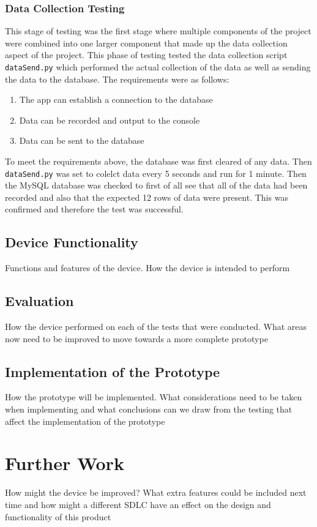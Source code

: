 \documentclass[10pt,a4paper]{article}
\begin{document}
\subsubsection{Data Collection Testing}
This stage of testing was the first stage where multiple components of the project were combined into one larger component that made up the data collection aspect of the project. This phase of testing tested the data collection script \texttt{dataSend.py} which performed the actual collection of the data as well as sending the data to the database. The requirements were as follows: 

\begin{enumerate}
  \item The app can establish a connection to the database
  \item Data can be recorded and output to the console
  \item Data can be sent to the database
\end{enumerate}

To meet the requirements above, the database was first cleared of any data. Then \texttt{dataSend.py} was set to colelct data every 5 seconds and run for 1 minute. Then the MySQL database was checked to first of all see that all of the data had been recorded and also that the expected 12 rows of data were present. This was confirmed and therefore the test was successful.

\subsection{Device Functionality}
Functions and features of the device. How the device is intended to perform
\subsection{Evaluation}
How the device performed on each of the tests that were conducted. What areas now need to be improved to move towards a more complete prototype
\subsection{Implementation of the Prototype}
How the prototype will be implemented. What considerations need to be taken when implementing and what conclusions can we draw from the testing that affect the implementation of the prototype

\pagebreak
\section{Further Work}
How might the device be improved? What extra features could be included next time and how might a different SDLC have an effect on the design and functionality of this product
\end{document}
